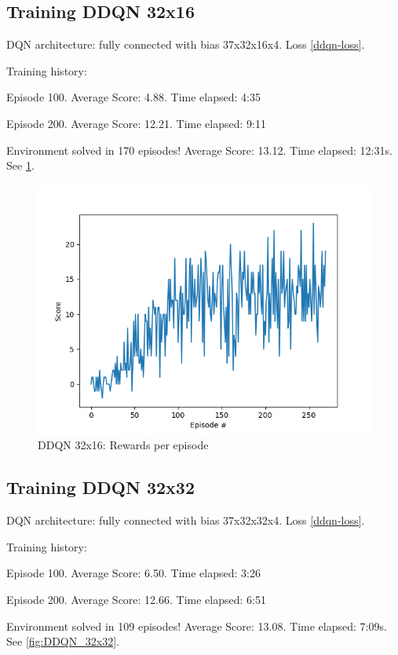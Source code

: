 \documentclass{report}
\begin{document}
\subsection*{Training DDQN 32x16}

DQN architecture: fully connected with bias 37x32x16x4. Loss \ref{ddqn-loss}.

Training history:

Episode 100.	Average Score: 4.88.	Time elapsed: 4:35

Episode 200.	Average Score: 12.21.	Time elapsed: 9:11

Environment solved in 170 episodes!	Average Score: 13.12. Time elapsed: 12:31s. See \ref{fig:DDQN_32x16}.

\begin{figure}
	\includegraphics[width=0.9\linewidth]{res/DDQN_32x16/score.png}
	\caption{DDQN 32x16: Rewards per episode}
	\label{fig:DDQN_32x16}
\end{figure}


\subsection*{Training DDQN 32x32}

DQN architecture: fully connected with bias 37x32x32x4. Loss \ref{ddqn-loss}.

Training history:

Episode 100.	Average Score: 6.50.	Time elapsed: 3:26

Episode 200.	Average Score: 12.66.	Time elapsed: 6:51

Environment solved in 109 episodes!	Average Score: 13.08. Time elapsed: 7:09s. See \ref{fig:DDQN_32x32}.
\end{document}
